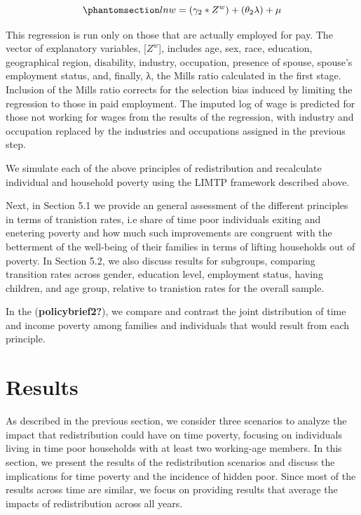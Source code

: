 \documentclass[
  11pt,
]{article}
\begin{document}
\begin{equation}\phantomsection\label{eq-OLS}{lnw= (\gamma_2*Z^w) + (\theta_2 \lambda) + \mu
}\end{equation}

This regression is run only on those that are actually employed for pay.
The vector of explanatory variables, {[}\(Z^w\){]}, includes age, sex,
race, education, geographical region, disability, industry, occupation,
presence of spouse, spouse's employment status, and, finally, λ, the
Mills ratio calculated in the first stage. Inclusion of the Mills ratio
corrects for the selection bias induced by limiting the regression to
those in paid employment. The imputed log of wage is predicted for those
not working for wages from the results of the regression, with industry
and occupation replaced by the industries and occupations assigned in
the previous step.

We simulate each of the above principles of redistribution and
recalculate individual and household poverty using the LIMTP framework
described above.

Next, in Section 5.1 we provide an general assessment of the different
principles in terms of tranistion rates, i.e share of time poor
individuals exiting and enetering poverty and how much such improvements
are congruent with the betterment of the well-being of their families in
terms of lifting households out of poverty. In Section 5.2, we also
discuss results for subgroups, comparing transition rates across gender,
education level, employment status, having children, and age group,
relative to tranistion rates for the overall sample.

In the (\textbf{policybrief2?}), we compare and contrast the joint
distribution of time and income poverty among families and individuals
that would result from each principle.

\section{Results}\label{results}

As described in the previous section, we consider three scenarios to
analyze the impact that redistribution could have on time poverty,
focusing on individuals living in time poor households with at least two
working-age members. In this section, we present the results of the
redistribution scenarios and discuss the implications for time poverty
and the incidence of hidden poor. Since most of the results across time
are similar, we focus on providing results that average the impacts of
redistribution across all years.
\end{document}
